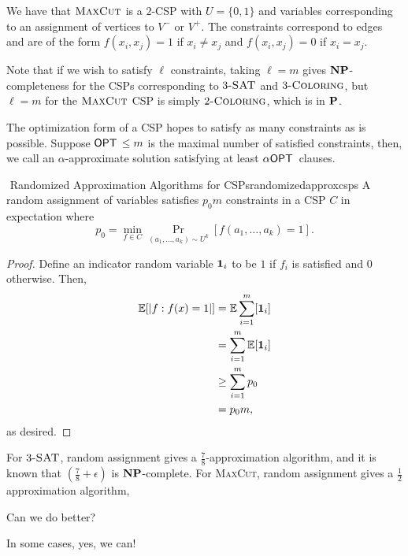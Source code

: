         \begin{example}
            We have that \(\textsc{MaxCut}\) is a \(2\)-CSP with \(U=\{0,1\}\) and variables corresponding to an assignment of vertices to \(V^-\) or \(V^+\). The constraints correspond to edges and are of the form \(f(x_i,x_j)=1\) if \(x_i\neq x_j\) and \(f(x_i,x_j)=0\) if \(x_i=x_j\).
        \end{example}
        \begin{remark*}
            Note that if we wish to satisfy \(\ell\) constraints, taking \(\ell=m\) gives \(\mathbf{NP}\)-completeness for the CSPs corresponding to \(3\textsc{-SAT}\) and \(3\textsc{-Coloring}\), but \(\ell=m\) for the \(\textsc{MaxCut}\) CSP is simply \(2\textsc{-Coloring}\), which is in \(\mathbf{P}\).
        \end{remark*}
        \begin{remark*}
            The optimization form of a CSP hopes to satisfy as many constraints as is possible. Suppose \(\mathsf{OPT\,}\leq m\) is the maximal number of satisfied constraints, then, we call an \(\alpha\)-approximate solution satisfying at least \(\alpha\mathsf{OPT\,}\) clauses.
        \end{remark*}
        \pagebreak
        \begin{theorem}{\Stop\,\,Randomized Approximation Algorithms for CSPs}{randomizedapproxcsps}
            A random assignment of variables satisfies \(p_0m\) constraints in a CSP \(C\) in expectation where
            \begin{equation*}
                p_0=\min_{f\in C}\Pr_{(a_1,\ldots,a_k)\sim U^k}[f(a_1,\ldots,a_k)=1].
            \end{equation*}
            \begin{proof}
                Define an indicator random variable \(\mathbf{1}_i\) to be \(1\) if \(f_i\) is satisfied and \(0\) otherwise. Then,
                \begin{align*}
                    \mathbb{E}[|f:f(x)=1|]&=\mathbb{E}\sum_{i=1}^m[\mathbf{1}_i] \\
                    &=\sum_{i=1}^m\mathbb{E}[\mathbf{1}_i] \\
                    &\geq \sum_{i=1}^m p_0 \\
                    &=p_0m,
                \end{align*}
                as desired.
            \end{proof}
        \end{theorem}
        \begin{remark*}
            For \(3\textsc{-SAT}\), random assignment gives a \(\frac{7}{8}\)-approximation algorithm, and it is known that \(\left(\frac{7}{8}+\epsilon\right)\) is \(\mathbf{NP}\)-complete. For \textsc{MaxCut}, random assignment gives a \(\frac{1}{2}\) approximation algorithm, 
        \end{remark*}
        \begin{question*}
            Can we do better?
        \end{question*}
        \begin{answer*}
            In some cases, yes, we can!
        \end{answer*}

